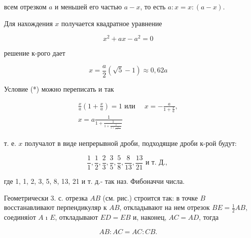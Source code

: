 \documentclass[10pt]{article}
\begin{document}
всем отрезком $a$ и меньшей его частью $a-x$, то есть $a: x=x:(a-x)$.



Для нахождения $x$ получается квадратное уравнение



\[

x^{2}+a x-a^{2}=0

\]



решение к-рого дает



\[

x=\frac{a}{2}(\sqrt{5}-1) \approx 0,62 a

\]



Условие (*) можно переписать и так



\[

\begin{gathered}

\frac{x}{a}\left(1+\frac{x}{a}\right)=1 \text { или } \quad x=-\frac{a}{1+\frac{x}{a}}, \\

x=a \frac{1}{1+\frac{1}{1+\frac{1}{1+\frac{1}{1+\ldots . .}}}}

\end{gathered}

\]



т. е. $x$ получалот в виде непрерывной дроби, подходящие дроби к-рой будут:



\[

\frac{1}{1}, \frac{1}{2}, \frac{2}{3}, \frac{3}{5}, \frac{5}{8}, \frac{8}{13}, \frac{13}{21} \text { и т. Д., }

\]



где 1, 1, 2, 3, 5, 8, 13, 21 и т. д.- так наз. Фибоначчи числа.



Геометрически 3. с. отрезка $A B$ (см. рис.) строится так: в точке $B$ восстанавливают перпендикуляр к $A B$, откладывают на нем отрезок $B E=\frac{1}{2} A B$, соединяіот $A$ ı $E$, откладывают $E D=E B$ и, наконец, $A C=A D$, тогда



\[

A B: A C=A C: C B .

\]
\end{document}
